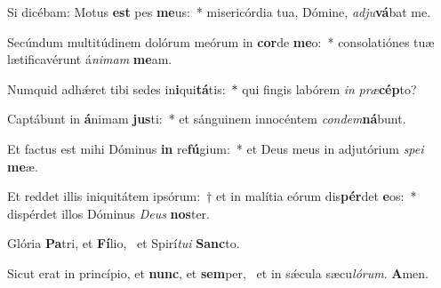 \item Si dicébam: Motus \textbf{est} pes \textbf{me}us:~* misericórdia tua, Dómine, \textit{ad}\textit{ju}\textbf{vá}bat me.
\item Secúndum multitúdinem dolórum meórum in \textbf{cor}de \textbf{me}o:~* consolatiónes tuæ lætificavérunt á\textit{ni}\textit{mam} \textbf{me}am.
\item Numquid adhǽret tibi sedes in\textbf{i}qui\textbf{tá}tis:~* qui fingis labórem \textit{in} \textit{præ}\textbf{cép}to?
\item Captábunt in \textbf{á}nimam \textbf{jus}ti:~* et sánguinem innocéntem \textit{con}\textit{dem}\textbf{ná}bunt.
\item Et factus est mihi Dóminus \textbf{in} re\textbf{fú}gium:~* et Deus meus in adjutórium \textit{spe}\textit{i} \textbf{me}æ.
\item Et reddet illis iniquitátem ipsórum:~† et in malítia eórum dis\textbf{pér}det \textbf{e}os:~* dispérdet illos Dóminus \textit{De}\textit{us} \textbf{nos}ter.
\item Glória \textbf{Pa}tri, et \textbf{Fí}lio,~\psstar{} et Spirí\textit{tu}\textit{i} \textbf{Sanc}to.
\item Sicut erat in princípio, et \textbf{nunc}, et \textbf{sem}per,~\psstar{} et in sǽcula sæcu\textit{ló}\textit{rum}. \textbf{A}men.